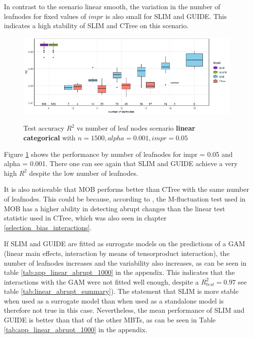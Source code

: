 In contrast to the scenario linear smooth, the variation in the number of leafnodes for fixed values of $impr$ is also small for SLIM and GUIDE. This indicates a high stability of SLIM and CTree on this scenario. 



\begin{figure}[!htb]
\centering
    \includegraphics[width=14cm]{Figures/simulations/batchtools/basic_scenarios/linear_abrupt/la_1000_standalone_r2_test.png}
    \label{fig:la_1000_standalone_r2_test}
    \caption{Test accuracy $R^2$ vs number of leaf nodes scenario     
\textbf{linear categorical} with $n=1500, alpha = 0.001, impr = 0.05$}
\end{figure} 

Figure \ref{fig:la_1000_standalone_r2_test} shows the performance by number of leafnodes for impr = 0.05 and alpha = 0.001. There one can see again that SLIM and GUIDE achieve a very high $R^2$ despite the low number of leafnodes. 

It is also noticeable that MOB performs better than CTree with the same number of leafnodes.
This could be because, according to \citep{Schlosser.2019}, the M-fluctuation test used in MOB has a higher ability in detecting abrupt changes than the linear test statistic used in CTree, which was also seen in chapter \ref{selection_bias_interactions}.



If SLIM and GUIDE are fitted as surrogate models on the predictions of a GAM (linear main effects, interaction by means of tensorproduct interaction), the number of leafnodes increases and the variability also increases, as can be seen in table \ref{tab:app_linear_abrupt_1000} in the appendix. This indicates that the interactions with the GAM were not fitted well enough, despite a  $R^2_{test} = 0.97$ see table \ref{tab:linear_abrupt_summary}). The statement that SLIM is more stable when used as a surrogate model than when used as a standalone model \citep{Hu.2020} is therefore not true in this case.
Nevertheless, the mean performance of SLIM and GUIDE is better than that of the other MBTs, as can be seen in Table \ref{tab:app_linear_abrupt_1000} in the appendix.




